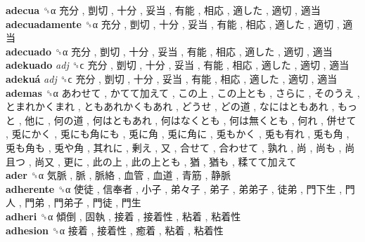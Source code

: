 \textbf{adecua} ␝α   充分 ,  剴切 ,  十分 ,  妥当 ,  有能 ,  相応 ,  適した ,  適切 ,  適当   \\
\textbf{adecuadamente} ␝α   充分 ,  剴切 ,  十分 ,  妥当 ,  有能 ,  相応 ,  適した ,  適切 ,  適当   \\
\textbf{adecuado} ␝α   充分 ,  剴切 ,  十分 ,  妥当 ,  有能 ,  相応 ,  適した ,  適切 ,  適当   \\
\textbf{adekuado} \emph{adj}  ␝ϲ   充分 ,  剴切 ,  十分 ,  妥当 ,  有能 ,  相応 ,  適した ,  適切 ,  適当   \\
\textbf{adekuá} \emph{adj}  ␝ϲ   充分 ,  剴切 ,  十分 ,  妥当 ,  有能 ,  相応 ,  適した ,  適切 ,  適当   \\
\textbf{ademas} ␝α   あわせて ,  かてて加えて ,  この上 ,  この上とも ,  さらに ,  そのうえ ,  とまれかくまれ ,  ともあれかくもあれ ,  どうせ ,  どの道 ,  なにはともあれ ,  もっと ,  他に ,  何の道 ,  何はともあれ ,  何はなくとも ,  何は無くとも ,  何れ ,  併せて ,  兎にかく ,  兎にも角にも ,  兎に角 ,  兎に角に ,  兎もかく ,  兎も有れ ,  兎も角 ,  兎も角も ,  兎や角 ,  其れに ,  剰え ,  又 ,  合せて ,  合わせて ,  孰れ ,  尚 ,  尚も ,  尚且つ ,  尚又 ,  更に ,  此の上 ,  此の上とも ,  猶 ,  猶も ,  糅てて加えて   \\
\textbf{ader} ␝α   気脈 ,  脈 ,  脈絡 ,  血管 ,  血道 ,  青筋 ,  静脈   \\
\textbf{adherente} ␝α   使徒 ,  信奉者 ,  小子 ,  弟々子 ,  弟子 ,  弟弟子 ,  徒弟 ,  門下生 ,  門人 ,  門弟 ,  門弟子 ,  門徒 ,  門生   \\
\textbf{adheri} ␝α   傾倒 ,  固執 ,  接着 ,  接着性 ,  粘着 ,  粘着性   \\
\textbf{adhesion} ␝α   接着 ,  接着性 ,  癒着 ,  粘着 ,  粘着性   \\
